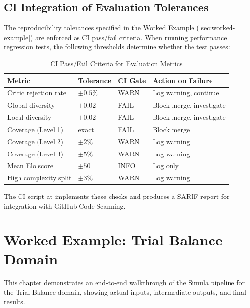 \documentclass[12pt,a4paper,twoside]{report}
\begin{document}
\section{CI Integration of Evaluation Tolerances}
\label{sec:ci-tolerances}

The reproducibility tolerances specified in the Worked Example
(\cref{sec:worked-example}) are enforced as CI pass/fail criteria.
When running performance regression tests, the following thresholds
determine whether the test passes:

\begin{table}[H]
\centering
\caption{CI Pass/Fail Criteria for Evaluation Metrics}
\label{tab:ci-pass-fail}
\begin{tabularx}{\textwidth}{lllX}
\toprule
\textbf{Metric} & \textbf{Tolerance} & \textbf{CI Gate} & \textbf{Action on Failure} \\
\midrule
Critic rejection rate & $\pm 0.5\%$ & WARN & Log warning, continue \\
Global diversity & $\pm 0.02$ & FAIL & Block merge, investigate \\
Local diversity & $\pm 0.02$ & FAIL & Block merge, investigate \\
Coverage (Level 1) & exact & FAIL & Block merge \\
Coverage (Level 2) & $\pm 2\%$ & WARN & Log warning \\
Coverage (Level 3) & $\pm 5\%$ & WARN & Log warning \\
Mean Elo score & $\pm 50$ & INFO & Log only \\
High complexity split & $\pm 3\%$ & WARN & Log warning \\
\bottomrule
\end{tabularx}
\end{table}

\noindent
The CI script at  implements
these checks and produces a SARIF report for integration with GitHub
Code Scanning.
\chapter{Worked Example: Trial Balance Domain}
\label{chap:worked-example}

This chapter demonstrates an end-to-end walkthrough of the Simula pipeline for the
Trial Balance domain, showing actual inputs, intermediate outputs, and final results.
\label{sec:worked-example}
\end{document}
